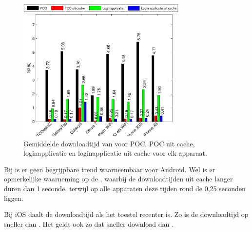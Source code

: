 \begin{figure}
  \centering
  \includegraphics[width=0.75\textwidth]{figuren/performance-lungo.pdf}
  \caption{Gemiddelde downloadtijd van \lungo{} voor POC,  POC uit cache,  loginapplicatie en loginapplicatie uit cache voor elk apparaat.}
  \label{fig:performantie-lungo}
\end{figure}

Bij \lungo{} is er geen begrijpbare trend waarneembaar voor Android.
Wel is er opmerkelijke waarneming op de \gs{}, waarbij de downloadtijden uit cache langer duren dan 1 seconde, terwijl op alle apparaten deze tijden rond de 0,25 seconden liggen.

Bij iOS daalt de downloadtijd als het toestel recenter is.
Zo is de downloadtijd op \ipadiii{} sneller dan \ipadi{}.
Het geldt ook zo dat \iphoneiv{} sneller download dan \iphoneiii{}.

